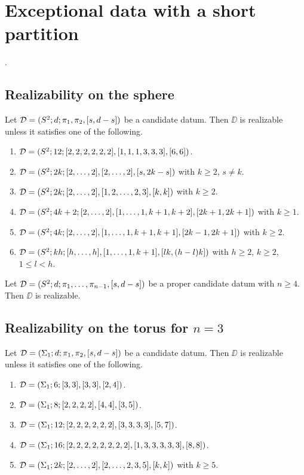 \chapter{Exceptional data with a short partition}
.

\section{Realizability on the sphere}

\begin{theorem}\label{short-partition:th:realizability-on-sphere-n-3}
Let $\mathcal{D}=(S^2{};d;\pi_1,\pi_2,[s,d-s])$ be a candidate datum. Then $\DD$ is realizable unless it satisfies one of the following.
\begin{enumerate}[(1)]
\item $\mathcal{D}=(S^2{};12;[2,2,2,2,2,2],[1,1,1,3,3,3],[6,6])$.
\item $\mathcal{D}=(S^2{};2k;[2,\ldots,2],[2,\ldots,2],[s,2k-s])$ with $k\ge 2$, $s\neq k$.
\item $\mathcal{D}=(S^2{};2k;[2,\ldots,2],[1,2,\ldots,2,3],[k,k])$ with $k\ge2$.
\item $\mathcal{D}=(S^2{};4k+2;[2,\ldots,2],[1,\ldots,1,k+1,k+2],[2k+1,2k+1])$ with $k\ge 1$.
\item $\mathcal{D}=(S^2{};4k;[2,\ldots,2],[1,\ldots,1,k+1,k+1],[2k-1,2k+1])$ with $k\ge2$.
\item $\mathcal{D}=(S^2{};kh;[h,\ldots,h],[1,\ldots,1,k+1],[lk,(h-l)k])$ with $h\ge 2$, $k\ge 2$, $1\le l<h$.
\end{enumerate}
\end{theorem}

\begin{theorem}\label{short-partition:th:realizability-on-sphere-n-ge-4}
Let $\mathcal{D}=(S^2{};d;\pi_1,\ldots,\pi_{n-1},[s,d-s])$ be a proper candidate datum with $n\ge 4$. Then $\DD$ is realizable.
\end{theorem}

\section{Realizability on the torus for $n=3$}

\begin{theorem}
Let $\mathcal{D}=(\Sigma_{1};d;\pi_1,\pi_2,[s,d-s])$ be a candidate datum. Then $\DD$ is realizable unless it satisfies one of the following.
\begin{enumerate}[(1)]
\item $\mathcal{D}=(\Sigma_{1};6;[3,3],[3,3],[2,4])$.
\item $\mathcal{D}=(\Sigma_{1};8;[2,2,2,2],[4,4],[3,5])$.
\item $\mathcal{D}=(\Sigma_{1};12;[2,2,2,2,2,2],[3,3,3,3],[5,7])$.
\item $\mathcal{D}=(\Sigma_{1};16;[2,2,2,2,2,2,2,2],[1,3,3,3,3,3],[8,8])$.
\item $\mathcal{D}=(\Sigma_{1};2k;[2,\ldots,2],[2,\ldots,2,3,5],[k,k])$ with $k\ge 5$.
\end{enumerate}
\end{theorem}

